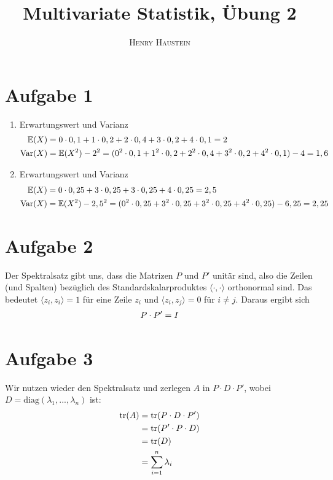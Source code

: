 \documentclass{article}
\title{\textbf{Multivariate Statistik, Übung 2}}
\author{\textsc{Henry Haustein}}
\date{}
\newcommand{\E}{\mathbb{E}}
\DeclareMathOperator{\tr}{tr}
\DeclareMathOperator{\Var}{Var}
\renewcommand{\E}{\mathbb{E}}
\begin{document}
	\maketitle
	
	\section*{Aufgabe 1}
	\begin{enumerate}[label=(\alph*)]
		\item Erwartungswert und Varianz
		\begin{align}
			\E(X) &= 0\cdot 0,1 + 1 \cdot 0,2 + 2 \cdot 0,4 + 3 \cdot 0,2 + 4 \cdot 0,1 = 2 \notag \\
			\Var(X) &= \E(X^2) - 2^2 = (0^2\cdot 0,1 + 1^2 \cdot 0,2 + 2^2 \cdot 0,4 + 3^2 \cdot 0,2 + 4^2 \cdot 0,1) - 4 = 1,6 \notag
		\end{align}
		\item Erwartungswert und Varianz
		\begin{align}
			\E(X) &= 0\cdot 0,25 + 3 \cdot 0,25 + 3 \cdot 0,25 + 4 \cdot 0,25 = 2,5 \notag \\
			\Var(X) &= \E(X^2) - 2,5^2 = (0^2\cdot 0,25 + 3^2 \cdot 0,25 + 3^2 \cdot 0,25 + 4^2 \cdot 0,25) - 6,25 = 2,25 \notag
		\end{align}
	\end{enumerate}

	\section*{Aufgabe 2}
	Der Spektralsatz gibt uns, dass die Matrizen $P$ und $P'$ unitär sind, also die Zeilen (und Spalten) bezüglich des Standardskalarproduktes $\langle\cdot,\cdot\rangle$ orthonormal sind. Das bedeutet $\langle z_i,z_i\rangle = 1$ für eine Zeile $z_i$ und $\langle z_i,z_j\rangle=0$ für $i\neq j$. Daraus ergibt sich
	\begin{align}
		P\cdot P' = I \notag
	\end{align}

	\section*{Aufgabe 3}
	Wir nutzen wieder den Spektralsatz und zerlegen $A$ in $P\cdot D\cdot P'$, wobei $D=\text{diag}(\lambda_1,...,\lambda_n)$ ist:
	\begin{align}
		\tr(A) &= \tr(P\cdot D\cdot P') \notag \\
		&= \tr(P'\cdot P\cdot D) \notag \\
		&= \tr(D) \notag \\
		&= \sum_{i=1}^{n} \lambda_i \notag
	\end{align}
\end{document}
